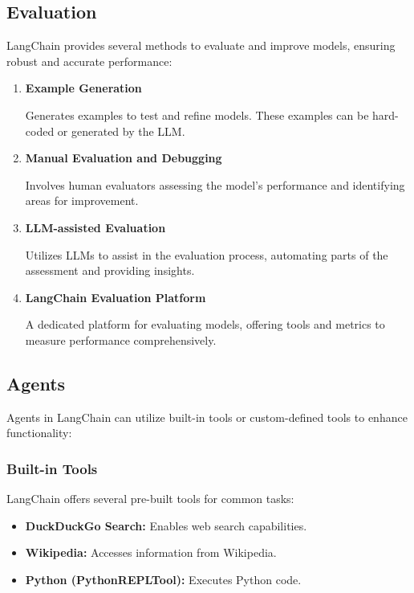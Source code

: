 \documentclass{article}
\begin{document}
\pagebreak

\subsection{Evaluation}

LangChain provides several methods to evaluate and improve models, ensuring robust and accurate performance:

\begin{enumerate}[label=\textbf{\arabic*.}, left=0pt, align=left, itemindent=*]
    \item \textbf{Example Generation}

    Generates examples to test and refine models. These examples can be hard-coded or generated by the LLM.

    \item \textbf{Manual Evaluation and Debugging}

    Involves human evaluators assessing the model's performance and identifying areas for improvement.

    \item \textbf{LLM-assisted Evaluation}

    Utilizes LLMs to assist in the evaluation process, automating parts of the assessment and providing insights.

    \item \textbf{LangChain Evaluation Platform}

    A dedicated platform for evaluating models, offering tools and metrics to measure performance comprehensively.
\end{enumerate}

\vspace{3cm}

\subsection{Agents}

Agents in LangChain can utilize built-in tools or custom-defined tools to enhance functionality:

\subsubsection{Built-in Tools}
LangChain offers several pre-built tools for common tasks:
\begin{itemize}
  \item \textbf{DuckDuckGo Search:} Enables web search capabilities.
  \item \textbf{Wikipedia:} Accesses information from Wikipedia.
  \item \textbf{Python (PythonREPLTool):} Executes Python code.
\end{itemize}
\end{document}
